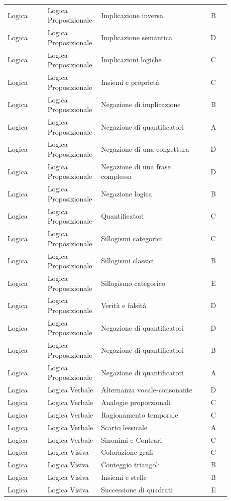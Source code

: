 \documentclass[20pt, a4paper]{article}
\begin{document}
\begin{longtable}{@{}>{\raggedright\arraybackslash}p{0.18\linewidth}>{\raggedright\arraybackslash}p{0.24\linewidth}>{\raggedright\arraybackslash}p{0.46\linewidth}c@{}}
Logica & Logica Proposizionale & Implicazione inversa & B \\
Logica & Logica Proposizionale & Implicazione semantica & D \\
Logica & Logica Proposizionale & Implicazioni logiche & C \\
Logica & Logica Proposizionale & Insiemi e proprietà & C \\
Logica & Logica Proposizionale & Negazione di implicazione & B \\
Logica & Logica Proposizionale & Negazione di quantificatori & A \\
Logica & Logica Proposizionale & Negazione di una congettura & D \\
Logica & Logica Proposizionale & Negazione di una frase complessa & D \\
Logica & Logica Proposizionale & Negazione logica & B \\
Logica & Logica Proposizionale & Quantificatori & C \\
Logica & Logica Proposizionale & Sillogismi categorici & C \\
Logica & Logica Proposizionale & Sillogismi classici & B \\
Logica & Logica Proposizionale & Sillogismo categorico & E \\
Logica & Logica Proposizionale & Verità e falsità & D \\
Logica & Logica Proposizionale & Negazione di quantificatori & D \\
Logica & Logica Proposizionale & Negazione di quantificatori & B \\
Logica & Logica Proposizionale & Negazione di quantificatori & A \\
Logica & Logica Verbale & Alternanza vocale-consonante & D \\
Logica & Logica Verbale & Analogie proporzionali & C \\
Logica & Logica Verbale & Ragionamento temporale & C \\
Logica & Logica Verbale & Scarto lessicale & A \\
Logica & Logica Verbale & Sinonimi e Contrari & C \\
Logica & Logica Visiva & Colorazione grafi & C \\
Logica & Logica Visiva & Conteggio triangoli & B \\
Logica & Logica Visiva & Insiemi e stelle & B \\
Logica & Logica Visiva & Successione di quadrati & E \\

\end{longtable}
\end{document}
